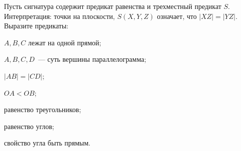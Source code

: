 Пусть сигнатура содержит предикат равенства и трехместный предикат $S$. Интерпретация: точки на плоскости, $S(X, Y, Z)$
означает, что $|XZ| = |YZ|$. Выразите предикаты:
\begin{enumcyr}
    \item $A, B, C$ лежат на одной прямой;
    \item $A, B, C, D$~--- суть вершины параллелограмма;
    \item $|AB| = |CD|$;
    \item $OA < OB$;
    \item равенство треугольников;
    \item равенство углов;
    \item свойство угла быть прямым.
\end{enumcyr}